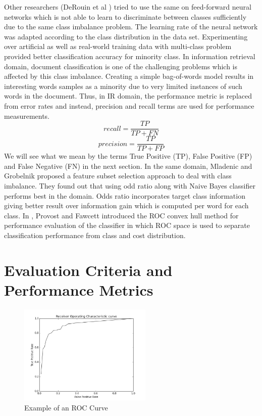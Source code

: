 \documentclass[10pt,journal,compsoc]{IEEEtran}
\begin{document}
Other researchers (DeRouin et al \cite{derouin91}) tried to use the same on feed-forward neural networks which is not able to learn to discriminate between classes sufficiently due to the same class imbalance problem.
The learning rate of the neural network was adapted according to the class distribution in the data set.
Experimenting over artificial as well as real-world training data with multi-class problem provided better classification accuracy for minority class.
In information retrieval domain, document classification is one of the challenging problems which is affected by this class imbalance.
Creating  a simple bag-of-words model results in interesting words samples as a minority due to very limited instances of such words in the document.
Thus, in IR domain, the performance metric is replaced from error rates and instead, precision and recall terms are used for performance measurements.
$$recall = \frac{TP}{TP + FN}$$ $$precision = \frac{TP}{TP + FP}$$
We will see what we mean by the terms True Positive (TP), False Positive (FP) and False Negative (FN) in the next section.
In the same domain, Mladenic and Grobelnik \cite{mg99} proposed a feature subset selection approach to deal with class imbalance.
They found out that using odd ratio along with Naive Bayes classifier performs best in the domain. 
Odds ratio incorporates target class information giving better result over information gain which is computed per word for each class.
In \cite{pf98}, Provost and Fawcett introduced the ROC convex hull method for performance evaluation of the classifier in which ROC space is used to separate classification performance from class and cost distribution. 


\section{Evaluation Criteria and Performance Metrics}
\label{sec:metrics}
\begin{figure}[!t]
	\centering
	\includegraphics[width=2.5in]{code/figures/mammography_ROC}
	\caption{Example of an ROC Curve}
	\label{fig:roc}
\end{figure}
\end{document}
